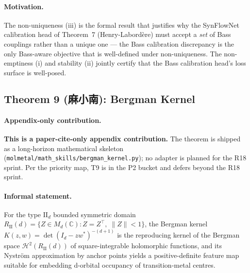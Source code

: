 \paragraph{Motivation.}
The non-uniqueness (iii) is the formal result that justifies why
the SynFlowNet calibration head of Theorem~7 (Henry-Labord\`ere)
must accept a \emph{set} of Bass couplings rather than a unique
one --- the Bass calibration discrepancy is the only Bass-aware
objective that is well-defined under non-uniqueness.  The
non-emptiness (i) and stability (ii) jointly certify that the
Bass calibration head's loss surface is well-posed.

\subsection{Theorem 9 (麻小南): Bergman Kernel}
\label{sec:math:T9}

\paragraph{Appendix-only contribution.}
\textbf{This is a paper-cite-only appendix contribution.}  The
theorem is shipped as a long-horizon mathematical skeleton
(\texttt{molmetal/math\_skills/bergman\_kernel.py}); no adapter is
planned for the R18 sprint.  Per the priority map, T9 is in the P2
bucket and defers beyond the R18 sprint.

\paragraph{Informal statement.}
For the type $\mathrm{II}_d$ bounded symmetric domain
$R_{\mathrm{II}}(d) = \{ Z \in M_d(\mathbb{C}) : Z = Z^{\top},\;
\|Z\| < 1 \}$, the Bergman kernel
$K(z, w) = \det(I_d - z w^{\ast})^{-(d+1)}$ is the reproducing
kernel of the Bergman space $\mathcal{H}^2(R_{\mathrm{II}}(d))$ of
square-integrable holomorphic functions, and its Nystr\"om
approximation by anchor points yields a positive-definite feature
map suitable for embedding d-orbital occupancy of transition-metal
centres.

